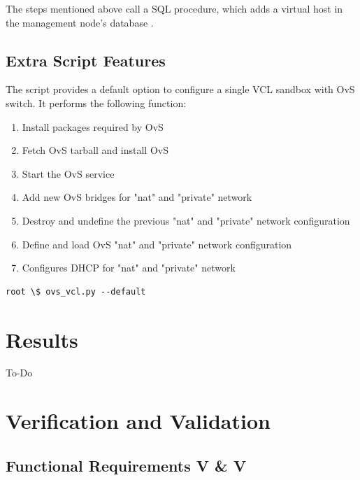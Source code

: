 \documentclass[12pt]{extarticle}
\begin{document}
The steps mentioned above call a SQL procedure, which adds a virtual host in the management node's database \cite{sqlprocedure}.


\subsection{Extra Script Features}
The script provides a default option to configure a single VCL sandbox with OvS switch. It performs the following function:
\begin{enumerate}
    \item Install packages required by OvS
    \item Fetch OvS tarball and install OvS
    \item Start the OvS service
    \item Add new OvS bridges for "nat" and "private" network
    \item Destroy and undefine the previous "nat" and "private" network configuration
    \item Define and load OvS "nat" and "private" network configuration
    \item Configures DHCP for "nat" and "private" network
\end{enumerate}

\begin{verbatim}
root \$ ovs_vcl.py --default
\end{verbatim}


\section{Results}
To-Do
\section{Verification and Validation}

\subsection{Functional Requirements V \& V}
\end{document}
